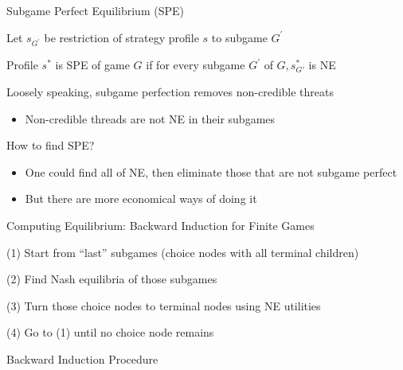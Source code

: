 \documentclass[11pt,aspectratio=169,handout]{beamer}
\begin{document}
  \begin{frame}{Subgame Perfect Equilibrium (SPE)}
   \begin{itemizes}
    \item Let $s_{G^\prime}$ be restriction of strategy profile $s$ to subgame $G^\prime$
    \item Profile $s^*$ is SPE of game $G$ if for \alert{every subgame} $G^\prime$ of $G, s^{*}_{G'}$ is NE
    \item Loosely speaking, subgame perfection \alert{removes non-credible threats}
    \begin{itemize}
     \item Non-credible threads are not NE in their subgames
    \end{itemize}
    \item How to find SPE?
    \begin{itemize}
     \item One could find all of NE, then eliminate those that are not subgame perfect
     \item But there are more economical ways of doing it
    \end{itemize}
   \end{itemizes}
  \end{frame}


  \begin{frame}{Computing Equilibrium: Backward Induction for Finite Games}
   \begin{itemizes}
    \item (1) Start from ``last'' subgames (choice nodes with all terminal children)
    \item (2) Find Nash equilibria of those subgames
    \item (3) Turn those choice nodes to terminal nodes using NE utilities 
    \item (4) Go to (1) until no choice node remains
   \end{itemizes}
  \end{frame}


  \begin{frame}{Backward Induction Procedure}
   \begin{algorithm*}[H]
   \label{alg:BI}
   \caption{Finding value of sample SPE of perfect-info extensive-form game}
   \end{algorithm*}
  \end{frame}
  
\end{document}
